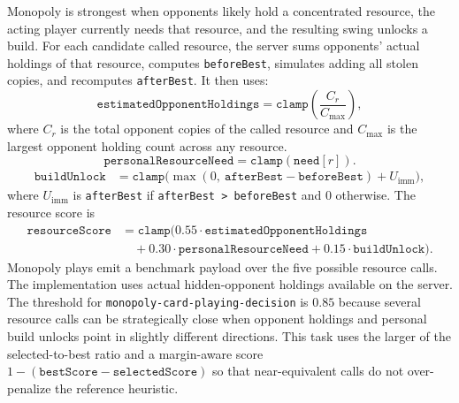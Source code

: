 \documentclass{article}
\begin{document}
Monopoly is strongest when opponents likely hold a concentrated resource, the acting player currently needs that resource, and the resulting swing unlocks a build.
For each candidate called resource, the server sums opponents' actual holdings of that resource, computes \texttt{beforeBest}, simulates adding all stolen copies, and recomputes \texttt{afterBest}. It then uses:
\[
\texttt{estimatedOpponentHoldings}
= \texttt{clamp}\left(\frac{C_r}{C_{\max}}\right),
\]
where $C_r$ is the total opponent copies of the called resource and $C_{\max}$ is the largest opponent holding count across any resource.
\[
\texttt{personalResourceNeed} = \texttt{clamp}(\texttt{need}[r]).
\]
\[
\begin{aligned}
\texttt{buildUnlock}
&= \texttt{clamp}\bigl(
\max(0,\ \texttt{afterBest} - \texttt{beforeBest}) + U_{\text{imm}}
\bigr),
\end{aligned}
\]
where $U_{\text{imm}}$ is \texttt{afterBest} if \texttt{afterBest > beforeBest} and $0$ otherwise.
The resource score is
\[
\begin{aligned}
\texttt{resourceScore}
&= \texttt{clamp}(
0.55 \cdot \texttt{estimatedOpponentHoldings} \\
&\quad + 0.30 \cdot \texttt{personalResourceNeed}
+ 0.15 \cdot \texttt{buildUnlock}).
\end{aligned}
\]
Monopoly plays emit a benchmark payload over the five possible resource calls. The implementation uses actual hidden-opponent holdings available on the server.
\\
The threshold for \texttt{monopoly-card-playing-decision} is $0.85$ because several resource calls can be strategically close when opponent holdings and personal build unlocks point in slightly different directions. This task uses the larger of the selected-to-best ratio and a margin-aware score $1-(\texttt{bestScore}-\texttt{selectedScore})$ so that near-equivalent calls do not over-penalize the reference heuristic.
\end{document}
